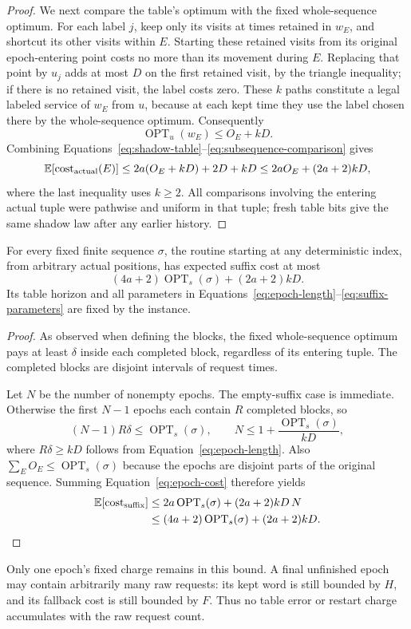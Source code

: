 \begin{proof}
We next compare the table's optimum with the fixed whole-sequence
optimum.  For each label $j$, keep only its visits at times retained in
$w_E$, and shortcut its other visits within $E$.  Starting these retained
visits from its original epoch-entering point costs no more than its
movement during $E$.  Replacing that point by $u_j$ adds at most $D$
on the first retained visit, by the triangle inequality; if there is no
retained visit, the label costs zero.  These $k$ paths constitute a legal
labeled service of $w_E$ from $u$, because at each kept time they use the
label chosen there by the whole-sequence optimum.  Consequently
\begin{equation}\label{eq:subsequence-comparison}
 \operatorname{OPT}_u(w_E)\le O_E+kD.
\end{equation}
Combining Equations~\eqref{eq:shadow-table}--\eqref{eq:subsequence-comparison}
gives
\[
 \mathbb E[\operatorname{cost}_{\rm actual}(E)]
 \le 2a(O_E+kD)+2D+kD
 \le 2aO_E+(2a+2)kD,
\]
where the last inequality uses $k\ge2$.  All comparisons involving the
entering actual tuple were pathwise and uniform in that tuple; fresh
table bits give the same shadow law after any earlier history.
\end{proof}



\begin{proposition}\label{prop:suffix}
For every fixed finite sequence $\sigma$, the routine starting at any
deterministic index, from arbitrary actual positions, has expected
suffix cost at most
\begin{equation}\label{eq:suffix-bound}
 (4a+2)\operatorname{OPT}_s(\sigma)+(2a+2)kD.
\end{equation}
Its table horizon and all parameters in
Equations~\eqref{eq:epoch-length}--\eqref{eq:suffix-parameters}
are fixed by the instance.
\end{proposition}

\begin{proof}
As observed when defining the blocks, the fixed whole-sequence optimum
pays at least $\delta$ inside each completed block, regardless of its
entering tuple. The completed blocks are disjoint intervals of request
times.

Let $N$ be the number of nonempty epochs.  The empty-suffix case is
immediate.  Otherwise the first $N-1$ epochs each contain $R$ completed
blocks, so
\[
 (N-1)R\delta\le \operatorname{OPT}_s(\sigma),
 \qquad
 N\le 1+\frac{\operatorname{OPT}_s(\sigma)}{kD},
\]
where $R\delta\ge kD$ follows from
Equation~\eqref{eq:epoch-length}.  Also
$\sum_E O_E\le\operatorname{OPT}_s(\sigma)$ because the epochs are
disjoint parts of the original sequence.  Summing
Equation~\eqref{eq:epoch-cost} therefore yields
\begin{align*}
 \mathbb E[\operatorname{cost}_{\rm suffix}]
 &\le 2a\operatorname{OPT}_s(\sigma)+(2a+2)kD\,N\\
 &\le (4a+2)\operatorname{OPT}_s(\sigma)+(2a+2)kD.
\end{align*}
\end{proof}

Only one epoch's fixed charge remains in this bound.  A final unfinished
epoch may contain arbitrarily many raw requests: its kept word is still
bounded by $H$, and its fallback cost is still bounded by $F$.  Thus no
table error or restart charge accumulates with the raw request count.
